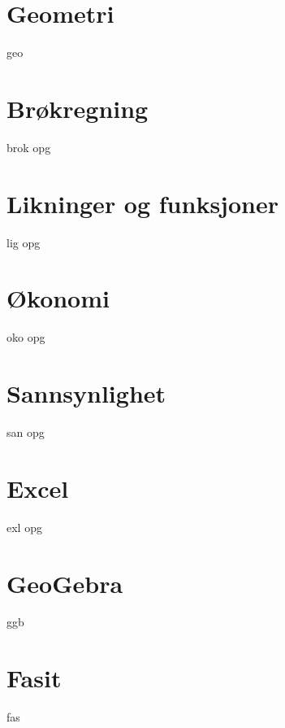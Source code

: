 



\graphicspath{{kap0/}}


\tableofcontents

\chapter{Geometri}
{geo}

\chapter{Brøkregning \label{Br}}
\newpage
{brok}
\newpage
{opg}

\chapter{Likninger og funksjoner \label{Lig}}
{lig}
{opg}


\chapter{Økonomi \label{Oko}}
{oko}
{opg}

\chapter{Sannsynlighet \label{San}} 
{san}
{opg}
\newpage

\chapter*{Excel} 
{exl}	
\newpage
{opg}	


\chapter*{GeoGebra} 
{ggb}	

\chapter*{Fasit}
{fas}






